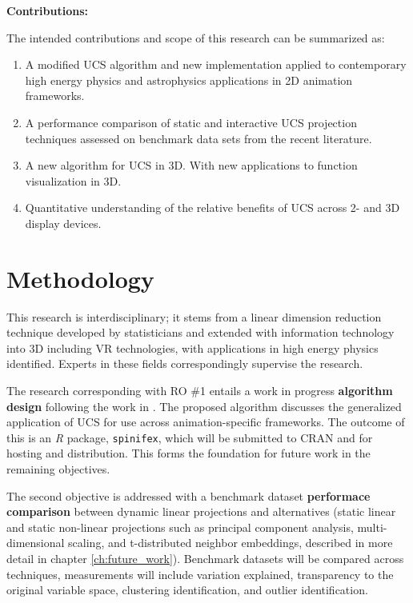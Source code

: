 \documentclass{monashthesis}
\begin{document}
\textbf{Contributions:}

The intended contributions and scope of this research can be summarized
as:

\begin{enumerate}
\def\labelenumi{\arabic{enumi}.}
\tightlist
\item
  A modified UCS algorithm and new implementation applied to
  contemporary high energy physics and astrophysics applications in 2D
  animation frameworks.
\item
  A performance comparison of static and interactive UCS projection
  techniques assessed on benchmark data sets from the recent literature.
\item
  A new algorithm for UCS in 3D. With new applications to function
  visualization in 3D.
\item
  Quantitative understanding of the relative benefits of UCS across 2-
  and 3D display devices.
\end{enumerate}

\section{Methodology}\label{methodology}

This research is interdisciplinary; it stems from a linear dimension
reduction technique developed by statisticians and extended with
information technology into 3D including VR technologies, with
applications in high energy physics
identified\autocite{cook_dynamical_2018}. Experts in these fields
correspondingly supervise the research.

The research corresponding with RO \#1 entails a work in progress
\textbf{algorithm design} following the work in
\textcite{cook_manual_1997}. The proposed algorithm discusses the
generalized application of UCS for use across animation-specific
frameworks. The outcome of this is an \emph{R} package,
\texttt{spinifex}, which will be submitted to CRAN and for hosting and
distribution. This forms the foundation for future work in the remaining
objectives.

The second objective is addressed with a benchmark dataset
\textbf{performace comparison} between dynamic linear projections and
alternatives (static linear and static non-linear projections such as
principal component analysis, multi-dimensional scaling, and
t-distributed neighbor embeddings, described in more detail in chapter
\ref{ch:future_work}). Benchmark datasets will be compared across
techniques, measurements will include variation explained, transparency
to the original variable space, clustering identification, and outlier
identification.
\end{document}
